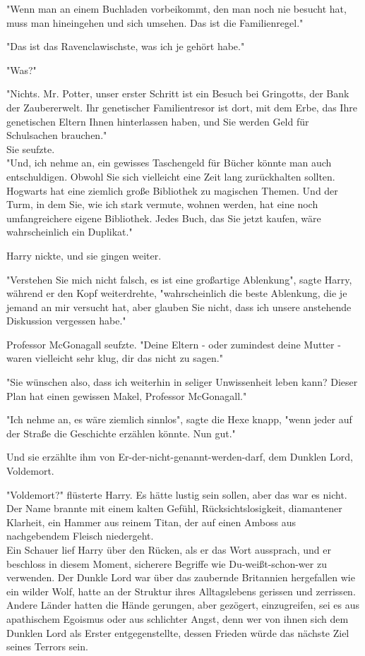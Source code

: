 {"Wenn man an einem Buchladen vorbeikommt, den man noch nie besucht hat, muss man hineingehen und sich umsehen. Das ist die Familienregel."

"Das ist das Ravenclawischste, was ich je gehört habe."

"Was?"

"Nichts. Mr. Potter, unser erster Schritt ist ein Besuch bei Gringotts, der Bank der Zaubererwelt. Ihr genetischer Familientresor ist dort, mit dem Erbe, das Ihre genetischen Eltern Ihnen hinterlassen haben, und Sie werden Geld für Schulsachen brauchen."\\ Sie seufzte.\\ "Und, ich nehme an, ein gewisses Taschengeld für Bücher könnte man auch entschuldigen. Obwohl Sie sich vielleicht eine Zeit lang zurückhalten sollten. Hogwarts hat eine ziemlich große Bibliothek zu magischen Themen. Und der Turm, in dem Sie, wie ich stark vermute, wohnen werden, hat eine noch umfangreichere eigene Bibliothek. Jedes Buch, das Sie jetzt kaufen, wäre wahrscheinlich ein Duplikat."

Harry nickte, und sie gingen weiter.

"Verstehen Sie mich nicht falsch, es ist eine großartige Ablenkung", sagte Harry, während er den Kopf weiterdrehte, "wahrscheinlich die beste Ablenkung, die je jemand an mir versucht hat, aber glauben Sie nicht, dass ich unsere anstehende Diskussion vergessen habe."

Professor McGonagall seufzte. "Deine Eltern - oder zumindest deine Mutter - waren vielleicht sehr klug, dir das nicht zu sagen."

"Sie wünschen also, dass ich weiterhin in seliger Unwissenheit leben kann? Dieser Plan hat einen gewissen Makel, Professor McGonagall."

"Ich nehme an, es wäre ziemlich sinnlos", sagte die Hexe knapp, "wenn jeder auf der Straße die Geschichte erzählen könnte. Nun gut."

Und sie erzählte ihm von Er-der-nicht-genannt-werden-darf, dem Dunklen Lord, Voldemort.

"Voldemort?" flüsterte Harry. Es hätte lustig sein sollen, aber das war es nicht. Der Name brannte mit einem kalten Gefühl, Rücksichtslosigkeit, diamantener Klarheit, ein Hammer aus reinem Titan, der auf einen Amboss aus nachgebendem Fleisch niedergeht.\\ Ein Schauer lief Harry über den Rücken, als er das Wort aussprach, und er beschloss in diesem Moment, sicherere Begriffe wie Du-weißt-schon-wer zu verwenden. Der Dunkle Lord war über das zaubernde Britannien hergefallen wie ein wilder Wolf, hatte an der Struktur ihres Alltagslebens gerissen und zerrissen.\\ Andere Länder hatten die Hände gerungen, aber gezögert, einzugreifen, sei es aus apathischem Egoismus oder aus schlichter Angst, denn wer von ihnen sich dem Dunklen Lord als Erster entgegenstellte, dessen Frieden würde das nächste Ziel seines Terrors sein.

}
